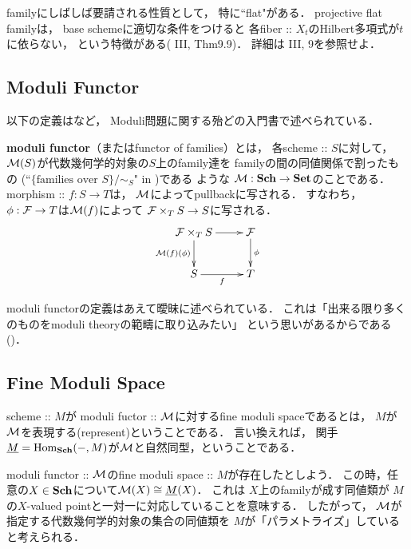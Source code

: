 \documentclass[a4paper]{jsarticle}
\begin{document}
    \begin{Remark}
        familyにしばしば要請される性質として，
        特に``flat"がある．
        projective flat familyは，
        base schemeに適切な条件をつけると
        各fiber :: $X_t$のHilbert多項式が$t$に依らない，
        という特徴がある(\cite{HarAG} III, Thm9.9)．
        詳細は\cite{HarAG} III, 9を参照せよ．
    \end{Remark}

    \subsection{Moduli Functor}
    以下の定義は\cite{HaMo}など，
    Moduli問題に関する殆どの入門書で述べられている．
    \begin{Def}
        \textbf{moduli functor}（またはfunctor of families）とは，
        各scheme :: $S$に対して，
        $\mathcal{M}(S)$が代数幾何学的対象の$S$上のfamily達を
        familyの間の同値関係で割ったもの
        (``$\{ \text{families over }S \}/\sim_S$" in \cite{Hos})である
        ような $\mathcal{M} : \mathbf{Sch} \to \mathbf{Set}$のことである．
        morphism :: $f : S \to T$は，
        $\mathcal{M}$によってpullbackに写される．
        すなわち，$\phi: \mathcal{F} \to T$は$\mathcal{M}(f)$によって
        $\mathcal{F} \times_T S \to S$に写される．
        \[\xymatrix{
                \famF \times_T S \ar[d]_-{\ftorM(f)(\phi)}\ar[r]& \famF \ar[d]^-{\phi}\\
            S \ar[r]_-{f}& T
        }\]
    \end{Def}
    moduli functorの定義はあえて曖昧に述べられている．
    これは「出来る限り多くのものをmoduli theoryの範疇に取り込みたい」
    という思いがあるからである(\cite{HaMo})．

    \subsection{Fine Moduli Space}
    \begin{Def}
        scheme :: $M$が
        moduli fuctor :: $\mathcal{M}$に対するfine moduli spaceであるとは，
        $M$が$\mathcal{M}$を表現する(represent)ということである．
        言い換えれば，
        関手$\underline{M}=\operatorname{Hom}_{\mathbf{Sch}}(-, M)$が$\mathcal{M}$と自然同型，ということである．
    \end{Def}

    \begin{Remark}
        moduli functor :: $\mathcal{M}$のfine moduli space :: $M$が存在したとしよう．
        この時，任意の$X \in \mathbf{Sch}$について$\mathcal{M}(X) \cong \underline{M}(X)$．
        これは
        $X$上のfamilyが成す同値類が
        $M$の$X$-valued pointと一対一に対応していることを意味する．
        したがって，
        $\mathcal{M}$が指定する代数幾何学的対象の集合の同値類を
        $M$が「パラメトライズ」していると考えられる．
    \end{Remark}
\end{document}
